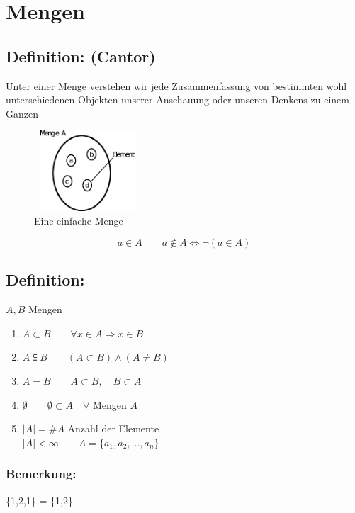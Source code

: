 \section{Mengen}
\subsection{Definition: (Cantor)}
Unter einer Menge verstehen wir jede Zusammenfassung von bestimmten wohl unterschiedenen Objekten unserer Anschauung oder unseren Denkens zu einem Ganzen\\

\begin{figure} [H]
\centering 
\includegraphics[width=4cm, height=3cm]{mainmatter/chapter0/pics/menge.png}
\caption{Eine einfache Menge} 
\end{figure}
\begin{equation*}
a \in A \qquad a \notin A \Leftrightarrow \neg (a \in A)
\end{equation*}
%
%
%
\subsection{Definition:}
$A, B$ Mengen 
\begin{enumerate}
\item $A \subset B \qquad \forall x \in A \Rightarrow x \in B$
\item $A \subsetneqq B \qquad (A \subset B) \wedge (A \neq B)$
\item $A = B \qquad A\subset B, \quad B\subset A$
\item $\emptyset \qquad \emptyset \subset A \quad \forall$ Mengen $A$
\item $|A| = \#A$ \qquad Anzahl der Elemente\\
 $|A| < \infty \qquad A=\{a_{1}, a_{2}, \dotsc, a_{n}\}$
\end{enumerate}
%
%
%
\subsubsection{Bemerkung:}
 \{1,2,1\} = \{1,2\}
%
%
%
